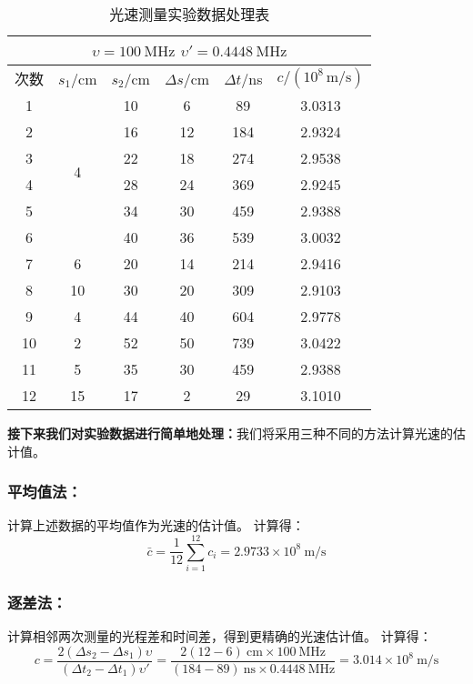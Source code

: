 \documentclass{Phyport}
\begin{document}
\begin{table}[H]
    \centering
    \caption{光速测量实验数据处理表}
    \renewcommand{\arraystretch}{1.3}
    \setlength{\tabcolsep}{8pt}
    \begin{tabular}{|c|c|c|c|c|c|}
        \hline
        \multicolumn{6}{|c|}{\textbf{$\upsilon = 100\ \mathrm{MHz}$ \quad $\upsilon' = 0.4448\ \mathrm{MHz}$}} \\
        \hline
        次数 & $s_1$/cm & $s_2$/cm & $\Delta s$/cm & $\Delta t$/ns & $c/(10^8\,\mathrm{m}/\mathrm{s})$ \\
        \hline
        1  & \multirow{6}{*}{4}  & 10 & 6  & 89  & 3.0313 \\
        2  &                      & 16 & 12 & 184 & 2.9324 \\
        3  &                      & 22 & 18 & 274 & 2.9538 \\
        4  &                      & 28 & 24 & 369 & 2.9245 \\
        5  &                      & 34 & 30 & 459 & 2.9388 \\
        6  &                      & 40 & 36 & 539 & 3.0032 \\
        \hline
        7  & 6  & 20 & 14 & 214 & 2.9416 \\
        8  & 10 & 30 & 20 & 309 & 2.9103 \\
        9  & 4  & 44 & 40 & 604 & 2.9778 \\
        10 & 2  & 52 & 50 & 739 & 3.0422 \\
        11 & 5  & 35 & 30 & 459 & 2.9388 \\
        12 & 15 & 17 & 2  & 29  & 3.1010 \\
        \hline
    \end{tabular}
\end{table}

\textbf{接下来我们对实验数据进行简单地处理：}我们将采用三种不同的方法计算光速的估计值。
\subsubsection{平均值法：}计算上述数据的平均值作为光速的估计值。
计算得：
\begin{equation}
    \bar{c} = \frac{1}{12} \sum_{i=1}^{12} c_i = 2.9733 \times 10^8\ \mathrm{m/s}
\end{equation}
\subsubsection{逐差法：}计算相邻两次测量的光程差和时间差，得到更精确的光速估计值。
计算得：
\begin{equation}
    c = \frac{2(\Delta s_2 - \Delta s_1)\upsilon }{(\Delta t_2 - \Delta t_1) \upsilon '} = \frac{2(12 - 6)\ \mathrm{cm} \times 100\ \mathrm{MHz}}{(184 - 89)\ \mathrm{ns} \times 0.4448\ \mathrm{MHz}} = 3.014\times 10^8\ \mathrm{m/s}
\end{equation}
\end{document}

